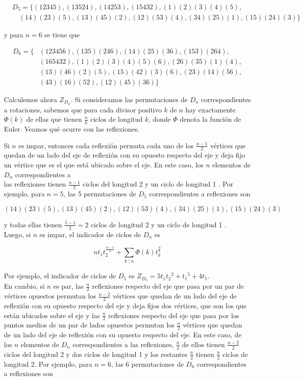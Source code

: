 \documentclass[10pt]{article}
\begin{document}
$$
\begin{aligned}
& D_{5}=\{(12345),(13524),(14253),(15432),(1)(2)(3)(4)(5), \\
& \quad(14)(23)(5),(13)(45)(2),(12)(53)(4),(34)(25)(1),(15)(24)(3)\}
\end{aligned}
$$

y para $n=6$ se tiene que

$$
\begin{aligned}
D_{6}=\{ & (123456),(135)(246),(14)(25)(36),(153)(264), \\
& (165432),(1)(2)(3)(4)(5)(6),(26)(35)(1)(4), \\
& (13)(46)(2)(5),(15)(42)(3)(6),(23)(14)(56), \\
& (43)(16)(52),(12)(45)(36)\}
\end{aligned}
$$

Calculemos ahora $Z_{D_{n}}$. Si consideramos las permutaciones de $D_{n}$ correspondientes a rotaciones, sabemos que para cada divisor positivo $k$ de $n$ hay exactamente $\Phi(k)$ de ellas que tienen $\frac{n}{k}$ ciclos de longitud $k$, donde $\Phi$ denota la función de Euler. Veamos qué ocurre con las reflexiones.

Si $n$ es impar, entonces cada reflexión permuta cada uno de los $\frac{n-1}{2}$ vértices que quedan de un lado del eje de reflexión con su opuesto respecto del eje y deja fijo un vértice que es el que está ubicado sobre el eje. En este caso, los $n$ elementos de $D_{n}$ correspondientes a\\
las reflexiones tienen $\frac{n-1}{2}$ ciclos del longitud 2 y un ciclo de longitud 1 . Por ejemplo, para $n=5$, las 5 permutaciones de $D_{5}$ correspondientes a reflexiones son

$$
(14)(23)(5),(13)(45)(2),(12)(53)(4),(34)(25)(1),(15)(24)(3)
$$

y todas ellas tienen $\frac{5-1}{2}=2$ ciclos de longitud 2 y un ciclo de longitud 1 .\\
Luego, si $n$ es impar, el indicador de ciclos de $D_{n}$ es

$$
n t_{1} t_{2}^{\frac{n-1}{2}}+\sum_{k \mid n} \Phi(k) t_{k}^{\frac{n}{k}}
$$

Por ejemplo, el indicador de ciclos de $D_{5}$ es $Z_{D_{5}}=5 t_{1} t_{2}{ }^{2}+t_{1}{ }^{5}+4 t_{5}$.\\
En cambio, si $n$ es par, las $\frac{n}{2}$ reflexiones respecto del eje que pasa por un par de vértices opuestos permutan los $\frac{n-2}{2}$ vértices que quedan de un lado del eje de reflexión con su opuesto respecto del eje y deja fijos dos vértices, que son los que están ubicados sobre el eje y las $\frac{n}{2}$ reflexiones respecto del eje que pasa por los puntos medios de un par de lados opuestos permutan los $\frac{n}{2}$ vértices que quedan de un lado del eje de reflexión con su opuesto respecto del eje. En este caso, de los $n$ elementos de $D_{n}$ correspondientes a las reflexiones, $\frac{n}{2}$ de ellos tienen $\frac{n-2}{2}$ ciclos del longitud 2 y dos ciclos de longitud 1 y los restantes $\frac{n}{2}$ tienen $\frac{n}{2}$ ciclos de longitud 2. Por ejemplo, para $n=6$, las 6 permutaciones de $D_{6}$ correspondientes a reflexiones son
\end{document}
